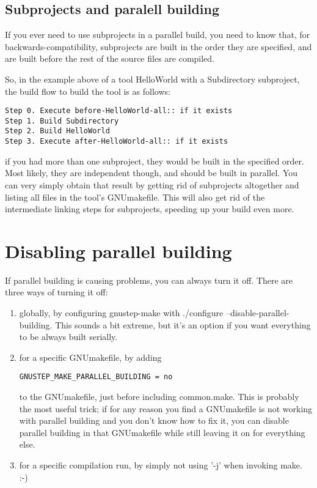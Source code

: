 \documentclass[a4paper]{article}
\begin{document}
\subsection{Subprojects and paralell building}
If you ever need to use subprojects in a parallel build, you need to
know that, for backwards-compatibility, subprojects are built in the
order they are specified, and are built before the rest of the source
files are compiled.

So, in the example above of a tool HelloWorld with a Subdirectory
subproject, the build flow to build the tool is as follows:

\begin{verbatim}
Step 0. Execute before-HelloWorld-all:: if it exists
Step 1. Build Subdirectory
Step 2. Build HelloWorld
Step 3. Execute after-HelloWorld-all:: if it exists
\end{verbatim}

if you had more than one subproject, they would be built in the
specified order.  Most likely, they are independent though, and should
be built in parallel.  You can very simply obtain that result by
getting rid of subprojects altogether and listing all files in the
tool's GNUmakefile.  This will also get rid of the intermediate
linking steps for subprojects, speeding up your build even more.

\section{Disabling parallel building}
If parallel building is causing problems, you can always turn it off.
There are three ways of turning it off:

\begin{enumerate}
\item globally, by configuring gnustep-make with ./configure
  --disable-parallel-building.  This sounds a bit extreme, but it's an
  option if you want everything to be always built serially.
\item for a specific GNUmakefile, by adding
\begin{verbatim}
GNUSTEP_MAKE_PARALLEL_BUILDING = no
\end{verbatim}
to the GNUmakefile, just before including common.make.  This is
probably the most useful trick; if for any reason you find a
GNUmakefile is not working with parallel building and you don't know
how to fix it, you can disable parallel building in that GNUmakefile
while still leaving it on for everything else.
\item for a specific compilation run, by simply not using '-j' when
invoking make. :-)
\end{enumerate}
\end{document}
